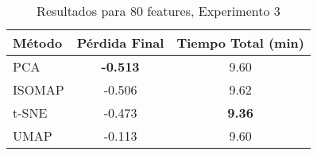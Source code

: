 
\begin{table}[h]
\centering
\begin{tabular}{lcc}
\toprule
\textbf{Método} & \textbf{Pérdida Final} & \textbf{Tiempo Total (min)} \\
\midrule
PCA & \textbf{-0.513} & 9.60 \\
ISOMAP & -0.506 & 9.62 \\
t-SNE & -0.473 & \textbf{9.36} \\
UMAP & -0.113 & 9.60 \\
\bottomrule
\end{tabular}
\caption{Resultados para 80 features, Experimento 3}
\label{tab:results_80feat_exp3}
\end{table}
